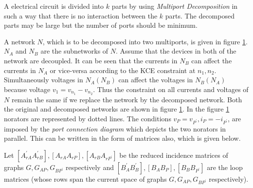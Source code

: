 \documentclass[10pt,psfig,letterpaper,twocolumn]{article}
\begin{document}
A electrical circuit is divided into $k$ parts by using {\it Multiport Decomposition} \cite{HN} in such a way that there is no 
interaction between the $k$ parts. The decomposed parts may be large but the number of ports should be minimum. \par
A network $N$, which is to be decomposed into two multiports, is given in figure \ref{multi}. $N_{A}$ and $N_{B}$ are the 
subnetworks of $N$. Assume that the devices in both of the network are decoupled.
It can be seen that the currents in $N_{B}$ can affect the currents in $N_{A}$ or vice-versa
according to the KCE constraint at $n_{1},n_{2}$. Simultaneously voltages in $N_{A}(N_{B})$ can affect the
voltages in $N_{B}(N_{A})$ because voltage $v_{1} = v_{n_{1}} - v_{n_{2}}$. Thus the constraint on
all currents and voltages of $N$ remain the same if we replace the network by the decomposed network. Both 
the original and decomposed networks are shown in figure \ref{multi}. In the figure \ref{multi} norators are 
represented by dotted lines. The conditions $v_{P} = v_{P^{'}}, i_{P} = -i_{P^{'}}$, are imposed by the 
{\it port connection diagram} which depicts the two norators in parallel. This can be written in the form 
of matrices also, which is given below.\par 

\hspace{1in}Let $[A_{rA}^{'} A_{rB}^{'}], [A_{rA} A_{rP}], [A_{rB} A_{rP^{'}}]$
be the reduced incidence matrices of graphs $G, G_{AP}, G_{BP^{'}}$ respectively and $[B_{A}^{'}
B_{B}^{'}], [B_{A} B_{P}], [B_{B} B_{P^{'}}]$ are the loop matrices (whose rows span the current space
of graphs $G, G_{AP}, G_{BP^{'}}$ respectively).

\begin{figure}[!ht]
{\centering {} \par}
\caption{}
\label{multi}
\end{figure}
\end{document}
